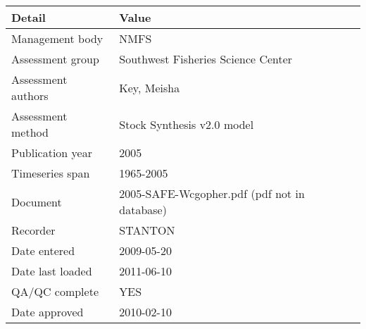 \begin{table}[htb]
\centering
\begin{tabular}{lp{7cm}}
\toprule
Detail & Value \\
\midrule
Management body    & NMFS                                         \\
Assessment group   & Southwest Fisheries Science Center           \\
Assessment authors & Key, Meisha                                  \\
Assessment method  & Stock Synthesis v2.0 model                   \\
Publication year   & 2005                                         \\
Timeseries span    & 1965-2005                                    \\
Document           & 2005-SAFE-Wcgopher.pdf (pdf not in database) \\
Recorder           & STANTON                                      \\
Date entered       & 2009-05-20                                   \\
Date last loaded   & 2011-06-10                                   \\
QA/QC complete     & YES                                          \\
Date approved      & 2010-02-10                                   \\
\bottomrule
\end{tabular}
\label{tab:assessdet}
\end{table}
